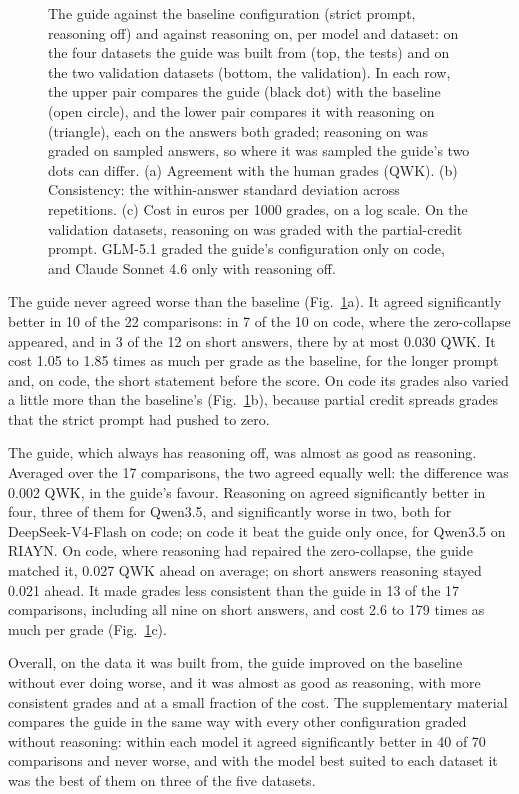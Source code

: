 \begin{figure}[!tb]
\centering

\caption{The guide against the baseline configuration (strict prompt, reasoning off) and against reasoning on, per
model and dataset: on the four datasets the guide was built from (top, the tests) and on the two validation
datasets (bottom, the validation). In each row, the upper pair compares the guide (black dot) with the baseline
(open circle), and the lower pair compares it with reasoning on (triangle), each on the answers both graded; reasoning
on was graded on sampled answers, so where it was sampled the guide's two dots can differ. (a) Agreement with the
human grades (QWK). (b)
Consistency: the within-answer standard deviation across repetitions. (c) Cost in euros per 1000 grades, on a log
scale. On the validation datasets, reasoning on was graded with the partial-credit prompt. GLM-5.1 graded the guide's configuration only on code, and
Claude Sonnet 4.6 only with reasoning off.}
\label{fig:guiderefs}
\end{figure}

The guide never agreed worse than the baseline (Fig.~\ref{fig:guiderefs}a). It agreed significantly better in 10 of
the 22 comparisons: in 7 of the 10 on code, where the zero-collapse appeared, and in 3 of the 12 on
short answers, there by at most 0.030 QWK. It cost 1.05 to 1.85 times as much per grade as the baseline, for the
longer prompt and, on code, the short statement before the score. On code its grades also varied a little more than
the baseline's (Fig.~\ref{fig:guiderefs}b), because partial credit spreads grades that the strict prompt had pushed
to zero.

The guide, which always has reasoning off, was almost as good as reasoning. Averaged over the 17 comparisons, the
two agreed equally well: the difference was 0.002 QWK, in the guide's favour. Reasoning on agreed significantly
better in four, three of them for Qwen3.5, and significantly worse in two, both
for DeepSeek-V4-Flash on code; on code it beat the guide only once, for Qwen3.5 on RIAYN. On code, where reasoning had
repaired the zero-collapse, the guide matched it, 0.027 QWK ahead on average; on short answers reasoning stayed
0.021 ahead. It made grades less
consistent than the guide in 13 of the 17 comparisons, including all nine on short answers, and cost 2.6 to 179
times as much per grade (Fig.~\ref{fig:guiderefs}c).

Overall, on the data it was built from, the guide improved on the baseline without ever doing worse, and it was
almost as good as reasoning, with more consistent grades and at a small fraction of the cost. The supplementary
material compares the guide in the same way with every other configuration graded without reasoning: within each
model it agreed significantly better in 40 of 70 comparisons and never worse, and with the model best suited to each
dataset it was the best of them on three of the five datasets.


